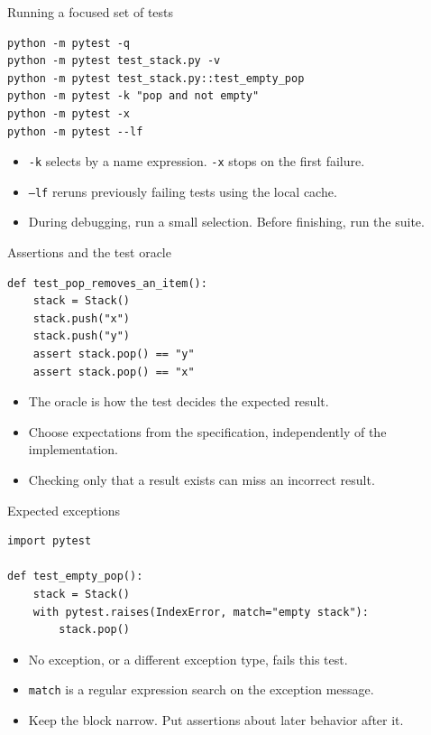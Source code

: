 \documentclass[aspectratio=169,11pt]{beamer}
\newcommand{\code}[1]{\texttt{#1}}
\begin{document}
\begin{frame}[fragile]{Running a focused set of tests}
\begin{lstlisting}
python -m pytest -q
python -m pytest test_stack.py -v
python -m pytest test_stack.py::test_empty_pop
python -m pytest -k "pop and not empty"
python -m pytest -x
python -m pytest --lf
\end{lstlisting}
\begin{itemize}
\item \code{-k} selects by a name expression. \code{-x} stops on the first failure.
\item \code{--lf} reruns previously failing tests using the local cache.
\item During debugging, run a small selection. Before finishing, run the suite.
\end{itemize}
\end{frame}

\begin{frame}[fragile]{Assertions and the test oracle}
\begin{lstlisting}
def test_pop_removes_an_item():
    stack = Stack()
    stack.push("x")
    stack.push("y")
    assert stack.pop() == "y"
    assert stack.pop() == "x"
\end{lstlisting}
\begin{itemize}
\item The oracle is how the test decides the expected result.
\item Choose expectations from the specification, independently of the implementation.
\item Checking only that a result exists can miss an incorrect result.
\end{itemize}
\end{frame}

\begin{frame}[fragile]{Expected exceptions}
\begin{lstlisting}
import pytest

def test_empty_pop():
    stack = Stack()
    with pytest.raises(IndexError, match="empty stack"):
        stack.pop()
\end{lstlisting}
\begin{itemize}
\item No exception, or a different exception type, fails this test.
\item \code{match} is a regular expression search on the exception message.
\item Keep the block narrow. Put assertions about later behavior after it.
\end{itemize}
\end{frame}
\end{document}

